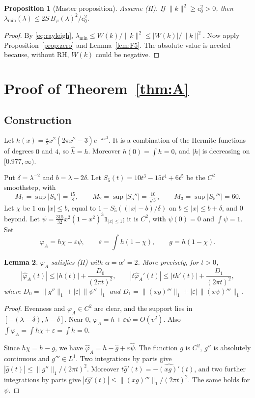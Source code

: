 \documentclass[11pt]{amsart}
\newtheorem{proposition}{Proposition}[section]
\newtheorem{lemma}[proposition]{Lemma}
\theoremstyle{definition}
\theoremstyle{remark}
\numberwithin{equation}{section}
\begin{document}
\begin{proposition}[Master proposition]\label{prop:master}
Assume (H). If $\|k\|^2\ge c_0^2>0$, then $\lambda_{\min}(\lambda)\le2S\,B_\varphi(\lambda)^2/c_0^2$.
\end{proposition}
\begin{proof}
By \eqref{eq:rayleigh}, $\lambda_{\min}\le W(k)/\|k\|^2\le|W(k)|/\|k\|^2$. Now apply Proposition~\ref{prop:zero} and Lemma~\ref{lem:F5}. The absolute value is needed because, without RH, $W(k)$ could be negative.
\end{proof}

\section{Proof of Theorem~\ref{thm:A}}\label{sec:A}

\subsection{Construction}
Let $h(x)=\frac\pi2x^2(2\pi x^2-3)e^{-\pi x^2}$. It is a combination of the Hermite functions of degrees $0$ and $4$, so $\hat h=h$. Moreover $h(0)=\int h=0$, and $|h|$ is decreasing on $[0.977,\infty)$.

Put $\delta=\lambda^{-2}$ and $b=\lambda-2\delta$. Let $S_5(t)=10t^3-15t^4+6t^5$ be the $C^2$ smoothstep, with
\[
M_1=\sup|S_5'|=\tfrac{15}8,\qquad M_2=\sup|S_5''|=\tfrac{10}{\sqrt3},\qquad M_3=\sup|S_5'''|=60 .
\]
Let $\chi$ be $1$ on $|x|\le b$, equal to $1-S_5((|x|-b)/\delta)$ on $b\le|x|\le b+\delta$, and $0$ beyond. Let $\psi=\frac{315}{32}x^2(1-x^2)^3\mathbf 1_{|x|\le1}$; it is $C^2$, with $\psi(0)=0$ and $\int\psi=1$. Set
\[
\varphi_A=h\chi+\varepsilon\psi,\qquad\varepsilon=\int h(1-\chi),\qquad g=h(1-\chi).
\]

\begin{lemma}\label{lem:A1}
$\varphi_A$ satisfies (H) with $\alpha=\alpha'=2$. More precisely, for $t>0$,
\begin{equation}\label{eq:A1}
|\hat\varphi_A(t)|\le|h(t)|+\frac{D_0}{(2\pi t)^2},\qquad |t\hat\varphi_A'(t)|\le|th'(t)|+\frac{D_1}{(2\pi t)^2},
\end{equation}
where $D_0=\|g''\|_1+|\varepsilon|\,\|\psi''\|_1$ and $D_1=\|(xg)'''\|_1+|\varepsilon|\,\|(x\psi)'''\|_1$.
\end{lemma}
\begin{proof}
Evenness and $\varphi_A\in C^2$ are clear, and the support lies in $[-(\lambda-\delta),\lambda-\delta]$. Near $0$, $\varphi_A=h+\varepsilon\psi=O(v^2)$. Also $\int\varphi_A=\int h\chi+\varepsilon=\int h=0$.

Since $h\chi=h-g$, we have $\hat\varphi_A=h-\hat g+\varepsilon\hat\psi$. The function $g$ is $C^2$, $g''$ is absolutely continuous and $g'''\in L^1$. Two integrations by parts give $|\hat g(t)|\le\|g''\|_1/(2\pi t)^2$. Moreover $t\hat g'(t)=-\widehat{(xg)'}(t)$, and two further integrations by parts give $|t\hat g'(t)|\le\|(xg)'''\|_1/(2\pi t)^2$. The same holds for $\psi$.
\end{proof}
\end{document}
